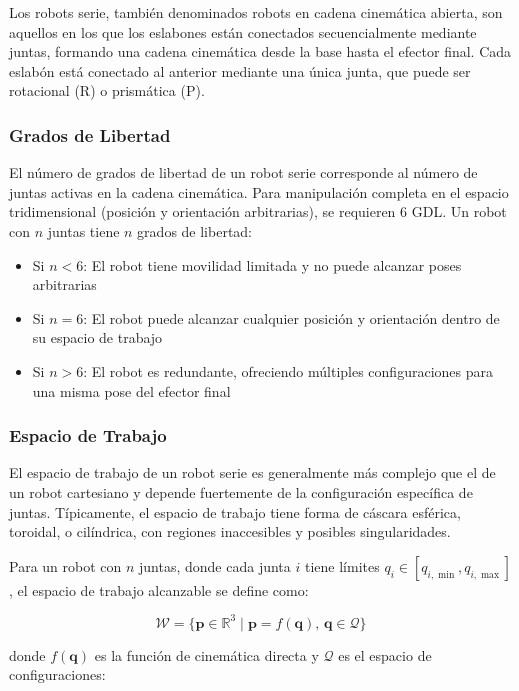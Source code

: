 Los robots serie, también denominados robots en cadena cinemática abierta, son aquellos en los que los eslabones están conectados secuencialmente mediante juntas, formando una cadena cinemática desde la base hasta el efector final. Cada eslabón está conectado al anterior mediante una única junta, que puede ser rotacional (R) o prismática (P).

\subsubsection{Grados de Libertad}

El número de grados de libertad de un robot serie corresponde al número de juntas activas en la cadena cinemática. Para manipulación completa en el espacio tridimensional (posición y orientación arbitrarias), se requieren 6 GDL. Un robot con $n$ juntas tiene $n$ grados de libertad:

\begin{itemize}
    \item Si $n < 6$: El robot tiene movilidad limitada y no puede alcanzar poses arbitrarias
    \item Si $n = 6$: El robot puede alcanzar cualquier posición y orientación dentro de su espacio de trabajo
    \item Si $n > 6$: El robot es redundante, ofreciendo múltiples configuraciones para una misma pose del efector final
\end{itemize}

\subsubsection{Espacio de Trabajo}

El espacio de trabajo de un robot serie es generalmente más complejo que el de un robot cartesiano y depende fuertemente de la configuración específica de juntas. Típicamente, el espacio de trabajo tiene forma de cáscara esférica, toroidal, o cilíndrica, con regiones inaccesibles y posibles singularidades.

Para un robot con $n$ juntas, donde cada junta $i$ tiene límites $q_i \in [q_{i,\min}, q_{i,\max}]$, el espacio de trabajo alcanzable se define como:

\begin{equation}
\mathcal{W} = \{\mathbf{p} \in \mathbb{R}^3 \mid \mathbf{p} = f(\mathbf{q}), \, \mathbf{q} \in \mathcal{Q}\}
\end{equation}

donde $f(\mathbf{q})$ es la función de cinemática directa y $\mathcal{Q}$ es el espacio de configuraciones:

